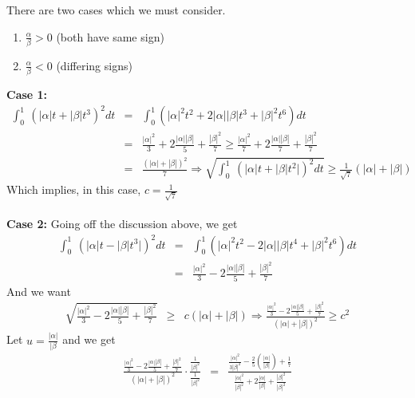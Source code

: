 \documentclass[11pt]{SelfArxOneColBMN}
\begin{document}
\begin{solution}
  \noindent There are two cases which we must consider.
  \begin{enumerate}
    \item $\frac{\alpha}{\beta} > 0$ (both have same sign)
    \item $\frac{\alpha}{\beta} < 0$ (differing signs)
  \end{enumerate}
  \textbf{Case 1:}\\
  \begin{eqnarray*}
    \int_0^1 \: ( |\alpha| t + |\beta| t^3)^2 dt
    &=&
    \int_0^1 ( |\alpha|^2 t^2 + 2 |\alpha| |\beta| t^3 + |\beta|^2 t^6 ) dt\\
    &=&
    \frac{|\alpha|^2}{3} + 2\frac{|\alpha| |\beta|}{5} + \frac{|\beta|^2}{7}
    \geq
    \frac{|\alpha|^2}{7} + 2\frac{|\alpha| |\beta|}{7} + \frac{|\beta|^2}{7}\\
    &=&
    \frac{\left( |\alpha| + |\beta| \right)^2}{7}
    \Longrightarrow
    \sqrt{\int_0^1 \: ( |\alpha| t + |\beta| t^2|)^2 dt}
    \geq \frac{1}{\sqrt{7}} ( |\alpha| + |\beta|)
  \end{eqnarray*}
  Which implies, in this case, $c = \frac{1}{\sqrt{7}}$\\
  \\
  \textbf{Case 2: }
  Going off the discussion above, we get
  \begin{eqnarray*}
    \int_0^1 \: ( |\alpha| t - |\beta| t^3|)^2 dt 
    &=&
    \int_0^1 ( |\alpha|^2 t^2 - 2 |\alpha| |\beta| t^4 + |\beta|^2 t^6 ) dt\\
    &=&
    \frac{|\alpha|^2}{3} - 2\frac{|\alpha| |\beta|}{5} + \frac{|\beta|^2}{7}
  \end{eqnarray*}
  And we want\\
  \begin{eqnarray*}
  \sqrt{\frac{|\alpha|^2}{3} - 2\frac{|\alpha| |\beta|}{5} + \frac{|\beta|^2}{7}}
  &\geq& c (|\alpha| + |\beta|)
  \Longrightarrow
  \frac{\frac{|\alpha|^2}{3} - 2\frac{|\alpha| |\beta|}{5} + \frac{|\beta|^2}{7}}{(|\alpha| + |\beta|)^2}
  \geq c^2
  \end{eqnarray*}
  Let $u = \frac{|\alpha|}{|\beta}$ and we get 
  \begin{eqnarray*}
  \frac{\frac{|\alpha|^2}{3} - 2\frac{|\alpha| |\beta|}{5} + \frac{|\beta|^2}{7}}{(|\alpha| + |\beta|)^2} \cdot \frac{\frac{1}{|\beta|^2}}{\frac{1}{|\beta|^2}}
  &=&
  \frac{\frac{|\alpha|^2}{3|\beta|^2} - \frac{2}{5}(\frac{|\alpha|}{|\beta|}) + \frac{1}{7}}{\frac{|\alpha|^2}{|\beta|^2} + 2\frac{|\alpha|}{|\beta|} + \frac{|\beta|^2}{|\beta|^2}}\\

\end{eqnarray*}
\end{solution}
\end{document}
